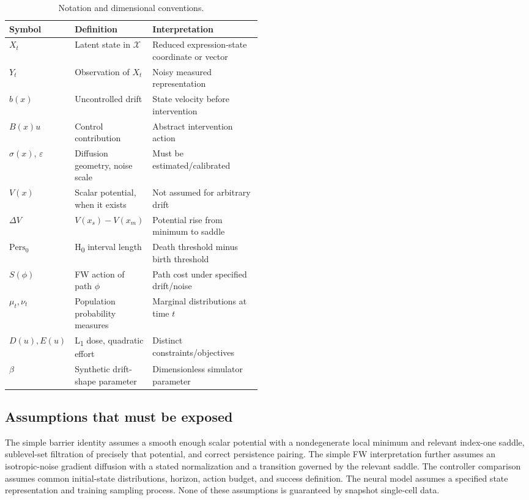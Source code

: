 \documentclass[11pt]{article}
\newcommand{\1}{\mathbf{1}}
\begin{document}
\begin{table}[tbp]\centering\small
\caption{Notation and dimensional conventions.}
\label{tab:notation}
\begin{tabularx}{\linewidth}{@{}p{0.18\linewidth}p{0.30\linewidth}X@{}}\toprule
Symbol & Definition & Interpretation \\\midrule
$X_t$ & Latent state in $\mathcal{X}$ & Reduced expression-state coordinate or vector \\
$Y_t$ & Observation of $X_t$ & Noisy measured representation \\
$b(x)$ & Uncontrolled drift & State velocity before intervention \\
$B(x)u$ & Control contribution & Abstract intervention action \\
$\sigma(x)$, $\varepsilon$ & Diffusion geometry, noise scale & Must be estimated/calibrated \\
$V(x)$ & Scalar potential, when it exists & Not assumed for arbitrary drift \\
$\Delta V$ & $V(x_s)-V(x_m)$ & Potential rise from minimum to saddle \\
$\mathrm{Pers}_0$ & H\textsubscript{0} interval length & Death threshold minus birth threshold \\
$S(\phi)$ & FW action of path $\phi$ & Path cost under specified drift/noise \\
$\mu_t,\nu_t$ & Population probability measures & Marginal distributions at time $t$ \\
$D(u), E(u)$ & L\textsubscript{1} dose, quadratic effort & Distinct constraints/objectives \\
$\beta$ & Synthetic drift-shape parameter & Dimensionless simulator parameter \\
\bottomrule\end{tabularx}
\end{table}

\subsection{Assumptions that must be exposed}
The simple barrier identity assumes a smooth enough scalar potential with a nondegenerate local minimum and relevant index-one saddle, sublevel-set filtration of precisely that potential, and correct persistence pairing. The simple FW interpretation further assumes an isotropic-noise gradient diffusion with a stated normalization and a transition governed by the relevant saddle. The controller comparison assumes common initial-state distributions, horizon, action budget, and success definition. The neural model assumes a specified state representation and training sampling process. None of these assumptions is guaranteed by snapshot single-cell data.
\end{document}
